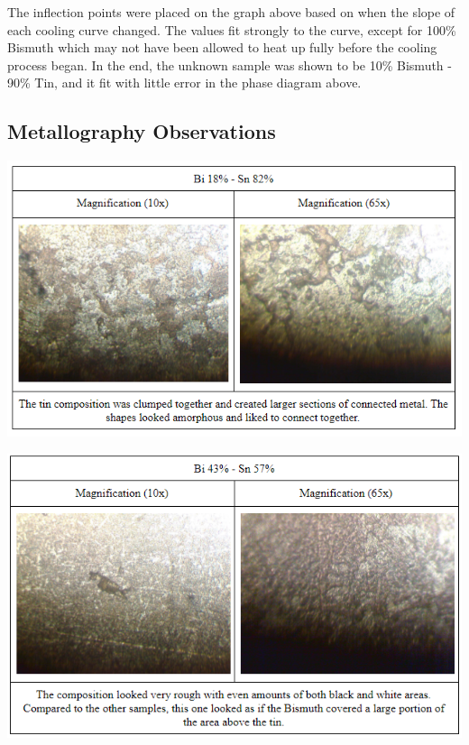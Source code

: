 \documentclass{article}
\begin{document}
The inflection points were placed on the graph above based on when the slope of each cooling curve changed. The values fit strongly to the curve, except for 100\% Bismuth which may not have been allowed to heat up fully before the cooling process began. In the end, the unknown sample was shown to be 10\% Bismuth - 90\% Tin, and it fit with little error in the phase diagram above. 

\subsection{Metallography Observations}

\begin{center}
\includegraphics[width=400pt]{Microscope18Bi82Sn.png}
\end{center}

\begin{center}
\includegraphics[width=400pt]{Microscope43Bi57Sn.png}
\end{center}
\end{document}
